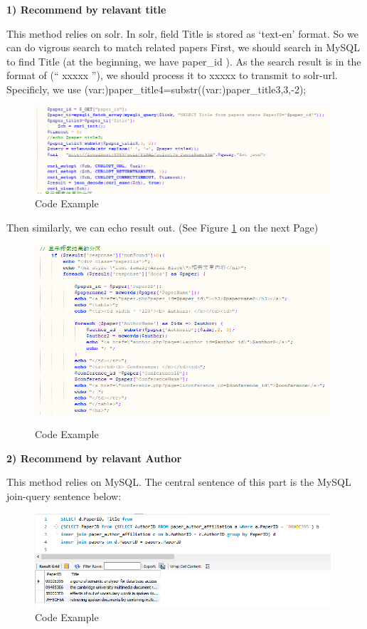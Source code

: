 \documentclass{book}
\begin{document}
\textbf{1) Recommend by relavant title}

This method relies on solr. In solr, field Title is stored as `text-en' format. So we can do vigrous search to match related papers First, we should search in MySQL to find Title (at the beginning, we have paper\_id ).
As the search result is in the format of (``    xxxxx   ''), 
we should process it to xxxxx to transmit to solr-url.
Specificly, we use   (var:)paper\_title4=substr((var:)paper\_title3,3,-2);


\begin{figure}[htp]
\centering
\includegraphics[width=11.0cm]{img/yhb_re_11.png}
\caption{Code Example}
\end{figure}

Then similarly, we can echo result out. (See Figure \ref{fig:yhb1} on the next Page)

\begin{figure}[h]
\centering
\includegraphics[width=11.0cm]{img/yhb_re_12.png}
\label{fig:yhb1}
\caption{Code Example}
\end{figure}


\textbf{2) Recommend by relavant Author}

This method relies on MySQL. The central sentence of this part is the MySQL join-query sentence below:
\begin{figure}[H]
\centering
\includegraphics[width=11.0cm]{img/yhb_mp_4.png}
\caption{Code Example}
\end{figure}
\end{document}
